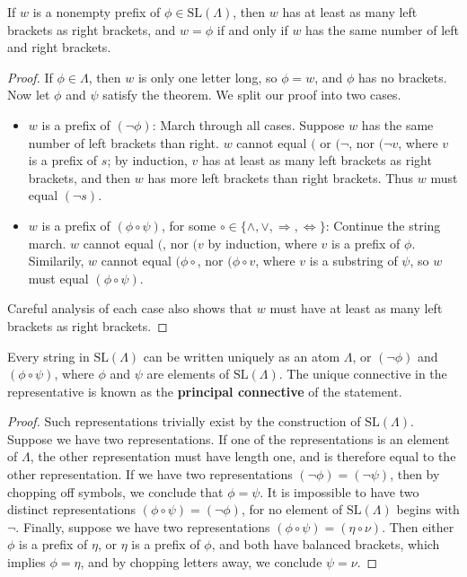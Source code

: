 \begin{theorem}
    If $w$ is a nonempty prefix of $\phi \in \text{SL}(\Lambda)$, then $w$ has at least as many left brackets as right brackets, and $w = \phi$ if and only if $w$ has the same number of left and right brackets.
\end{theorem}
\begin{proof}
    If $\phi \in \Lambda$, then $w$ is only one letter long, so $\phi = w$, and $\phi$ has no brackets. Now let $\phi$ and $\psi$ satisfy the theorem. We split our proof into two cases.
    \begin{itemize}
        \item $w$ is a prefix of $(\neg \phi)$: March through all cases. Suppose $w$ has the same number of left brackets than right. $w$ cannot equal $($ or $(\neg$, nor $(\neg v$, where $v$ is a prefix of $s$; by induction, $v$ has at least as many left brackets as right brackets, and then $w$ has more left brackets than right brackets. Thus $w$ must equal $(\neg s)$.
        \item $w$ is a prefix of $(\phi \circ \psi)$, for some $\circ \in \{ \wedge, \vee, \Rightarrow, \Leftrightarrow \}$: Continue the string march. $w$ cannot equal $($, nor $(v$ by induction, where $v$ is a prefix of $\phi$. Similarily, $w$ cannot equal $(\phi \circ$, nor $(\phi \circ v$, where $v$ is a substring of $\psi$, so $w$ must equal $(\phi \circ \psi)$.
    \end{itemize}
    Careful analysis of each case also shows that $w$ must have at least as many left brackets as right brackets.
\end{proof}

\begin{corollary}
    Every string in $\text{SL}(\Lambda)$ can be written uniquely as an atom $\Lambda$, or $(\neg \phi)$ and $(\phi \circ \psi)$, where $\phi$ and $\psi$ are elements of $\text{SL}(\Lambda)$. The unique connective in the representative is known as the {\bf principal connective} of the statement.
\end{corollary}
\begin{proof}
    Such representations trivially exist by the construction of $\text{SL}(\Lambda)$. Suppose we have two representations. If one of the representations is an element of $\Lambda$, the other representation must have length one, and is therefore equal to the other representation. If we have two representations $(\neg \phi) = (\neg \psi)$, then by chopping off symbols, we conclude that $\phi = \psi$. It is impossible to have two distinct representations $(\phi \circ \psi) = (\neg \phi)$, for no element of $\text{SL}(\Lambda)$ begins with $\neg$. Finally, suppose we have two representations $(\phi \circ \psi) = (\eta \circ \nu)$. Then either $\phi$ is a prefix of $\eta$, or $\eta$ is a prefix of $\phi$, and both have balanced brackets, which implies $\phi = \eta$, and by chopping letters away, we conclude $\psi = \nu$.
\end{proof}

